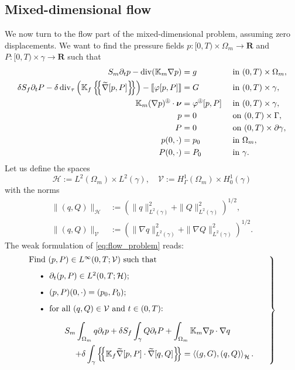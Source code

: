 \documentclass[a4paper]{article}
\def\agrad{\widetilde\nabla}
\def\avg#1{\left\{\mskip-5mu\left\{#1\right\}\mskip-5mu\right\}}
\def\div{\operatorname{div}}
\def\dt{\prtl_t}
\def\dual#1#2{\left\langle #1,#2\right\rangle}
\def\Hf{\mathcal H}
\def\jmp#1{\left\llbracket #1 \right\rrbracket}
\def\nnu{\vc\nu}
\def\norm#1{\|#1\|}
\def\pphi{{\varphi}}
\def\prtl{\partial}
\def\Real{{\mathbf R}}
\def\tn#1{{\mathbb{#1}}}    %
\def\Vf{{\mathcal V}} %
\def\vc#1{\mathbf{\boldsymbol{#1}}}     %
\newcommand{\eq}[1]{\begin{equation}#1\end{equation}}
\newcommand{\opm}{ %
  {\mathbin{
    \mathchoice
      {\buildcirclepm{\displaystyle     }{0.14ex}{0.95}{0.05ex}{.7}}
      {\buildcirclepm{\textstyle        }{0.14ex}{0.95}{0.05ex}{.7}}
      {\buildcirclepm{\scriptstyle      }{0.13ex}{0.955}{0.04ex}{.55}}
      {\buildcirclepm{\scriptscriptstyle}{0.08ex}{0.95}{0.03ex}{.45}}
  }} 
}
\newcommand\buildcirclepm[5]{%
  \begin{tikzpicture}[baseline=(X.base), inner sep=-#5, outer sep=-.65]
    \node[draw,circle,line width=#4] (X)  {\footnotesize\raisebox{#2}{\scalebox{#3}{$#1\pm$}}};
  \end{tikzpicture}%
}
\begin{document}
\subsection{Mixed-dimensional flow}

We now turn to the flow part of the mixed-dimensional problem, assuming zero displacements.
We want to find the pressure fields $p:[0,T)\times\Omega_m\to\Real$ and $P:[0,T)\times\gamma\to\Real$ such that
\begin{subequations}\label{eq:flow_problem}
\begin{align}
S_m\dt p - \div(\tn K_m\nabla p) &= g &&\mbox{ in }(0,T)\times\Omega_m,\\
\delta S_f\dt P - \delta\div_\tau\left(\tn K_f\avg{\agrad[p,P]}\right) - \jmp{\pphi[p,P]} &= G &&\mbox{ in }(0,T)\times\gamma,\\
\label{eq:condition_pP} \tn K_m(\nabla p)^\opm\cdot\nnu &= \pphi^\opm[p,P] &&\mbox{ in }(0,T)\times\gamma,\\
\label{eq:bc_p} p & = 0 &&\mbox{ on }(0,T)\times\Gamma,\\
\label{eq:bc_P} P & = 0 &&\mbox{ on }(0,T)\times\prtl\gamma,\\
p(0,\cdot) & = p_0 &&\mbox{ in }\Omega_m,\\
P(0,\cdot) & = P_0 &&\mbox{ in }\gamma.
\end{align}
\end{subequations}
Let us define the spaces
\eq{ \Hf := L^2(\Omega_m)\times L^2(\gamma),\quad \Vf := H^1_\Gamma(\Omega_m)\times H^1_0(\gamma) }
with the norms
\begin{align}
\norm{(q,Q)}_\Hf &:= (\norm{q}_{L^2(\gamma)}^2 + \norm{Q}_{L^2(\gamma)}^2)^{1/2},\\
\norm{(q,Q)}_\Vf &:= (\norm{\nabla q}_{L^2(\gamma)}^2 + \norm{\nabla Q}_{L^2(\gamma)}^2)^{1/2}.
\end{align}
The weak formulation of \eqref{eq:flow_problem} reads:
\eq{ \label{eq:flow_weak} \left.\begin{minipage}{0.85\textwidth}
Find $(p,P)\in L^\infty(0,T;\Vf)$ such that
\begin{itemize}
\item $\dt(p,P)\in L^2(0,T;\Hf)$;
\item $(p,P)(0,\cdot)=(p_0,P_0)$;
\item for all $(q,Q)\in\Vf$ and $t\in(0,T)$:
\[ \begin{aligned}S_m\int_{\Omega_m}q\dt p + \delta S_f\int_\gamma Q\dt P + \int_{\Omega_m}\tn K_m\nabla p\cdot\nabla q\hspace{1cm}\\
+ \delta\int_\gamma\avg{\tn K_f\agrad[p,P]\cdot\agrad[q,Q]}
= \dual{(g,G)}{(q,Q)}_\Hf.\end{aligned} \]
\end{itemize}
\end{minipage}\right\} }
\end{document}
